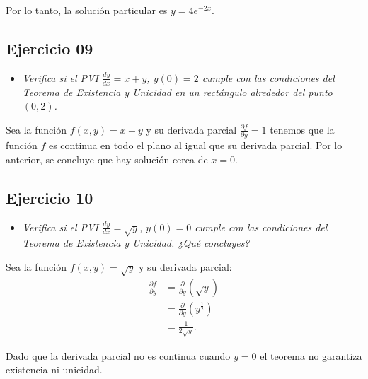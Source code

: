 \documentclass[12pt]{article}
\begin{document}
Por lo tanto, la solución particular es \(y = 4e^{-2x}\).

\subsection*{\centering Ejercicio 09 }

\begin{itemize}
    \item \emph{Verifica si el PVI \(\frac{dy}{dx} = x + y\), \(y(0) = 2\) cumple con las condiciones del Teorema de Existencia y Unicidad en un rectángulo alrededor del punto \((0, 2)\).}
\end{itemize}

Sea la función \(f(x, y) = x + y\) y su derivada parcial \(\frac{\partial f}{\partial y} = 1\) tenemos que la función \(f\) es continua en todo el plano al igual que su derivada parcial. Por lo anterior, se concluye que hay solución cerca de \(x = 0\).

\subsection*{\centering Ejercicio 10 }

\begin{itemize}
    \item \emph{Verifica si el PVI \(\frac{dy}{dx} = \sqrt{y}\), \(y(0) = 0\) cumple con las condiciones del Teorema de Existencia y Unicidad. ¿Qué concluyes?}
\end{itemize}

Sea la función \(f(x, y) = \sqrt{y}\) y su derivada parcial:
\begin{align*}
    \frac{\partial f}{\partial y} &= \frac{\partial}{\partial y}\left(\sqrt{y}\right) \\
    &= \frac{\partial}{\partial y}\left(y^{\frac{1}{2}}\right) \\
    &= \frac{1}{2\sqrt{y}}.
\end{align*}

Dado que la derivada parcial no es continua cuando \(y = 0\) el teorema no garantiza existencia ni unicidad.
\end{document}
